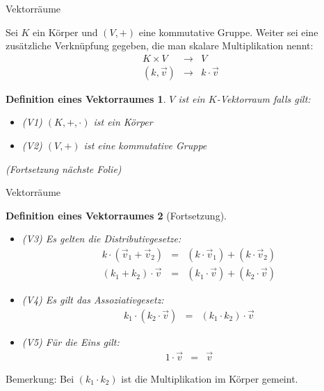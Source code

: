 \documentclass[german]{beamer}
\newcommand{\bq}{\begin{eqnarray*}}
\newcommand{\eq}{\end{eqnarray*}}
\newtheorem*{mytheorem8}{Definition eines Vektorraumes}
\begin{document}
\begin{frame}{Vektorr\"aume}

Sei $K$ ein K\"orper und $(V,+)$ eine kommutative Gruppe. 
Weiter sei eine zus\"atzliche Verkn\"upfung gegeben, die man skalare Multiplikation nennt:
\bq
K \times V & \rightarrow & V \\
(k,\vec{v}) & \rightarrow & k \cdot \vec{v}
\eq

\begin{mytheorem8}
$V$ ist ein $K$-Vektorraum falls gilt:
\begin{itemize}
\item (V1) $(K,+,\cdot)$ ist ein K\"orper
\item (V2) $(V,+)$ ist eine kommutative Gruppe
\end{itemize}
{\footnotesize (Fortsetzung n\"achste Folie)}
\end{mytheorem8}

\end{frame}

\begin{frame}{Vektorr\"aume}

\begin{mytheorem8}[Fortsetzung]
\begin{itemize}
\item (V3) Es gelten die Distributivgesetze:
\bq
k \cdot ( \vec{v}_1 + \vec{v}_2 ) &=  & (k \cdot \vec{v}_1 ) + ( k \cdot \vec{v}_2 ) \\
(k_1 + k_2 ) \cdot \vec{v} & = & (k_1 \cdot \vec{v}) + ( k_2 \cdot \vec{v})
\eq
\item (V4) Es gilt das Assoziativgesetz:
\bq
k_1 \cdot ( k_2 \cdot \vec{v}) & = & ( k_1 \cdot k_2 ) \cdot \vec{v}
\eq
\item (V5) F\"ur die Eins gilt:
\bq
1 \cdot \vec{v} & = & \vec{v}
\eq
\end{itemize}
\end{mytheorem8}
Bemerkung: Bei $(k_1 \cdot k_2)$ ist die Multiplikation im K\"orper gemeint.

\end{frame}
\end{document}
